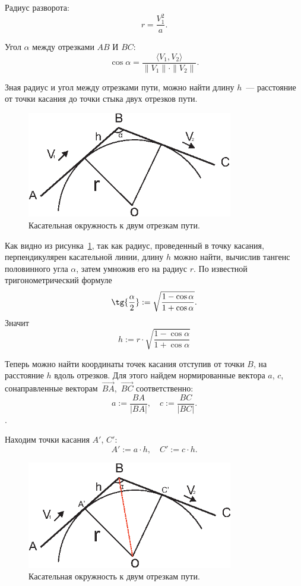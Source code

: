 \documentclass[a4paper,12pt]{article}
\begin{document}
Радиус разворота: 
$$
  r = \frac{V_1^2}{a}.
$$

Угол $\alpha$ между отрезками $AB$ И $BC$:
$$
  \cos{\alpha} = \frac{\langle V_1,V_2 \rangle}{\|V_1\| \cdot \|V_2\|}.
$$

Зная радиус и угол между отрезками пути, можно найти длину $h$~--- расстояние от точки касания до точки стыка двух отрезков пути.

\begin{figure}[h]
\centering
\includegraphics[width=90mm]{3pointCircle.eps}
\caption{Касательная окружность к двум отрезкам пути.}\label{two_lines_and_circle}
\end{figure}
Как видно из рисунка~\ref{two_lines_and_circle}, так как радиус, проведенный в точку касания, перпендикулярен касательной линии, длину $h$ можно найти, вычислив тангенс половинного угла $\alpha$, затем умножив его на радиус $r$. По известной тригонометрический формуле 
$$
  \tg{\frac{\alpha}{2}} := \sqrt{\frac{1-\cos{\alpha}}{1+\cos{\alpha}}}.
$$
Значит 
$$h := r \cdot \sqrt{\frac{1-\cos{\alpha}}{1+\cos{\alpha}}}$$

Теперь можно найти координаты точек касания отступив от точки $B$, на расстояние $h$ вдоль отрезков. Для этого найдем нормированные вектора $a$, $c$, сонаправленные векторам~$\overrightarrow{BA}$,~$\overrightarrow{BC}$ соответственно: 
\begin{equation*}
  a:=\frac{BA}{|BA|}, \quad c:=\frac{BC}{|BC|}.
\end{equation*}
.

Находим точки касания $A'$, $C'$:
\begin{equation*}
  A' := a \cdot h, \quad C' := c \cdot h.
\end{equation*}
\newpage

\begin{figure}[h]
\centering
\includegraphics[width=90mm]{tochki_kasania.eps}
\caption{Касательная окружность к двум отрезкам пути.}\label{two_lines_and_circle_2}
\end{figure}
\end{document}
